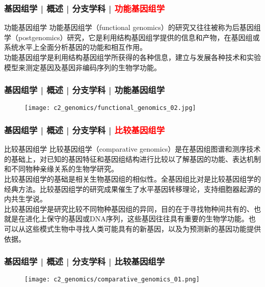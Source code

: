 \begin{frame}
  \frametitle{基因组学 | 概述 | 分支学科 | \textcolor{red}{功能基因组学}}
  \begin{block}{功能基因组学}
功能基因组学（functional genomics）的研究又往往被称为后基因组学（postgenomics）研究，它是利用结构基因组学提供的信息和产物，在基因组或系统水平上全面分析基因的功能和相互作用。\\
\vspace{1em}
功能基因组学是利用结构基因组学所获得的各种信息，建立与发展各种技术和实验模型来测定基因及基因非编码序列的生物学功能。
  \end{block}
\end{frame}

\begin{frame}
  \frametitle{基因组学 | 概述 | 分支学科 | 功能基因组学}
  \begin{figure}
    \centering
    \texttt{[image: c2\_genomics/functional\_genomics\_02.jpg]}
  \end{figure}
\end{frame}

\begin{frame}
  \frametitle{基因组学 | 概述 | 分支学科 | \textcolor{red}{比较基因组学}}
  \begin{block}{比较基因组学}
比较基因组学（comparative genomics）是在基因组图谱和测序技术的基础上，对已知的基因特征和基因组结构进行比较以了解基因的功能、表达机制和不同物种亲缘关系的生物学研究。\\
\vspace{1em}
比较基因组学的基础是相关生物基因组的相似性。全基因组比对是比较基因组学的经典方法。比较基因组学的研究成果催生了水平基因转移理论，支持细胞器起源的内共生学说。\\
\vspace{1em}
比较基因组学是研究比较不同物种基因组的异同，目的在于寻找物种间共有的、也就是在进化上保守的基因或DNA序列，这些基因往往具有重要的生物学功能。也可以从这些模式生物中寻找人类可能具有的新基因，以及为预测新的基因功能提供依据。
  \end{block}
\end{frame}

\begin{frame}
  \frametitle{基因组学 | 概述 | 分支学科 | 比较基因组学}
  \begin{figure}
    \centering
    \texttt{[image: c2\_genomics/comparative\_genomics\_01.png]}
  \end{figure}
\end{frame}

